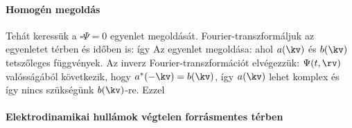    \paragraph{Homogén megoldás}
    
    Tehát keressük a $\square\Psi=0$ egyenlet megoldását.
   Fourier-transzformáljuk az egyenletet térben és időben is:
    így 
    Az egyenlet megoldása:
    ahol $a(\kv)$ és $b(\kv)$ tetszőleges függvények.
   Az inverz Fourier-transzformációt elvégezzük:
    $\Psi(t,\rv)$ valósságából következik, hogy $a^*(-\kv)=b(\kv)$, így $a(\kv)$ lehet komplex és így nincs szükségünk $b(\kv)$-re.
   Ezzel
   \paragraph{Elektrodinamikai hullámok végtelen forrásmentes térben}
    
